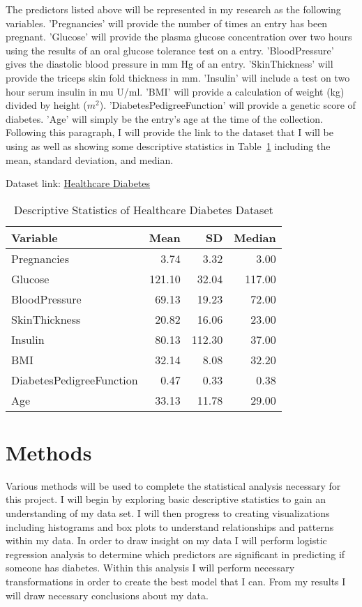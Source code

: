 \documentclass[12pt]{article}
\begin{document}
    The predictors listed above will be represented in my research as the following variables. 'Pregnancies' will provide the number of times an entry has been pregnant. 'Glucose' will provide the plasma glucose concentration over two hours using the results of an oral glucose tolerance test on a entry. 'BloodPressure' gives the diastolic blood pressure in mm Hg of an entry. 'SkinThickness' will provide the triceps skin fold thickness in mm. 'Insulin' will include a test on two hour serum insulin in mu U/ml. 'BMI' will provide a calculation of weight (kg) divided by height ($m^2$). 'DiabetesPedigreeFunction' will provide a genetic score of diabetes. 'Age' will simply be the entry's age at the time of the collection. Following this paragraph, I will provide the link to the dataset that I will be using as well as showing some descriptive statistics in Table~\ref{tab:ds} including the mean, standard deviation, and median.  

Dataset link: \href{https://www.kaggle.com/datasets/nanditapore/healthcare-diabetes}{Healthcare Diabetes}

\begin{table}[ht]
    \caption{Descriptive Statistics of Healthcare Diabetes Dataset}
  \label{tab:ds}
\centering
\begin{tabular}{lrrr}
      \hline
    Variable & Mean & SD & Median \\ 
      \hline
      Pregnancies & 3.74 & 3.32 & 3.00 \\ 
      Glucose & 121.10 & 32.04 & 117.00 \\ 
      BloodPressure & 69.13 & 19.23 & 72.00 \\ 
      SkinThickness & 20.82 & 16.06 & 23.00 \\ 
      Insulin & 80.13 & 112.30 & 37.00 \\ 
      BMI & 32.14 & 8.08 & 32.20 \\ 
      DiabetesPedigreeFunction & 0.47 & 0.33 & 0.38 \\ 
      Age & 33.13 & 11.78 & 29.00 \\ 
       \hline
    \end{tabular}
    \end{table}

\section{Methods}
\label{sec:meth}
    Various methods will be used to complete the statistical analysis necessary for this project. I will begin by exploring basic descriptive statistics to gain an understanding of my data set. I will then progress to creating visualizations including histograms and box plots to understand relationships and patterns within my data. In order to draw insight on my data I will perform logistic regression analysis to determine which predictors are significant in predicting if someone has diabetes. Within this analysis I will perform necessary transformations in order to create the best model that I can. From my results I will draw necessary conclusions about my data.
    
\end{document}
